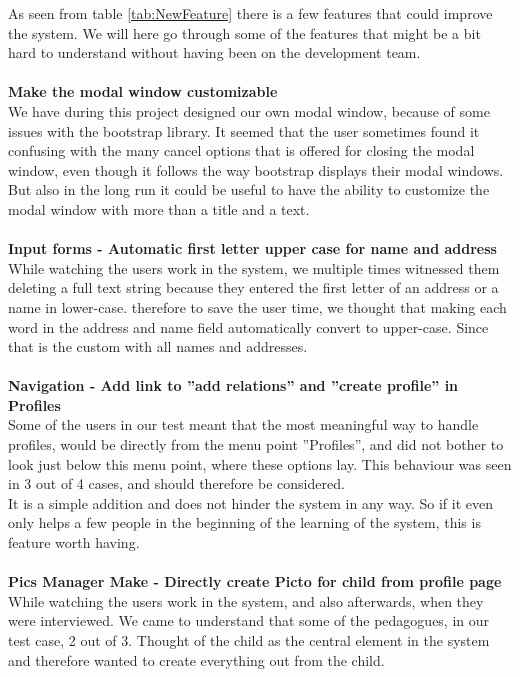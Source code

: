 As seen from table \ref{tab:NewFeature} there is a few features that could improve the system. We will here go through some of the features that might be a bit hard to understand without having been on the development team.\\
\\
\textbf{Make the modal window customizable}\\
We have during this project designed our own modal window, because of some issues with the bootstrap library. It seemed that the user sometimes found it confusing with the many cancel options that is offered for closing the modal window, even though it follows the way bootstrap displays their modal windows.\\
But also in the long run it could be useful to have the ability to customize the modal window with more than a title and a text.\\
\\
\textbf{Input forms - Automatic first letter upper case for name and address}\\
While watching the users work in the system, we multiple times witnessed them deleting a full text string because they entered the first letter of an address or a name in lower-case. therefore to save the user time, we thought that making each word in the address and name field automatically convert to upper-case. Since that is the custom with all names and addresses.\\
\\
\textbf{Navigation - Add link to ''add relations'' and ''create profile'' in Profiles}\\
Some of the users in our test meant that the most meaningful way to handle profiles, would be directly from the menu point ''Profiles'', and did not bother to look just below this menu point, where these options lay. This behaviour was seen in 3 out of 4 cases, and should therefore be considered.\\
It is a simple addition and does not hinder the system in any way. So if it even only helps a few people in the beginning of the learning of the system, this is feature worth having.\\
\\
\textbf{Pics Manager Make - Directly create Picto for child from profile page}\\
While watching the users work in the system, and also afterwards, when they were interviewed. We came to understand that some of the pedagogues, in our test case, 2 out of 3. Thought of the child as the central element in the system and therefore wanted to create everything out from the child.\\
